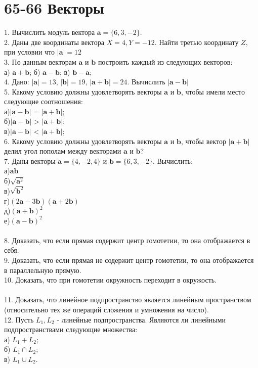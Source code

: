 \documentclass[12pt]{article}
\begin{document}
\section*{65-66 Векторы}
1. Вычислить модуль вектора $\bm{a} = \{6, 3, -2\}.$\\
2. Даны две координаты вектора $X = 4, Y = -12$. Найти третью координату $Z$, при условии что $|\bm{a}| = 12$\\
3. По данным векторам $\bm{a}$ и $\bm{b}$ построить каждый из следующих векторов:\\
а) $\bm{a+b}$;
б) $\bm{a-b}$;
в) $\bm{b-a}$;\\
4. Дано: $|\bm{a}| = 13$, $|\bm{b}| = 19$, $|\bm{a+b}| = 24$. Вычислить $|\bm{a-b}|$\\
5. Какому условию должны удовлетворять векторы $\bm{a}$ и $\bm{b}$, чтобы имели место следующие соотношения:\\
а)$|\bm{a-b}|$ = $|\bm{a+b}|$;\\
б)$|\bm{a-b}|$ > $|\bm{a+b}|$;\\
в)$|\bm{a-b}|$ < $|\bm{a+b}|$;\\
6. Какому условию должны удовлетворять векторы $\bm{a}$ и $\bm{b}$, чтобы вектор $|\bm{a+b}|$ делил угол пополам между векторами $\bm{a}$ и $\bm{b}$?\\
7. Даны векторы $\bm{a} = \{4,-2,4\}$ и $\bm{b} = \{6, 3, -2\}$. Вычислить:\\
а)$\bm{a}\bm{b} $\\
б)$\sqrt{\bm{a}^2}$\\
в)$\sqrt{\bm{b}^2}$\\
г)$(2\bm{a} - 3\bm{b})(\bm{a}+2\bm{b})$\\
д)$(\bm{a}+\bm{b})^2$\\
е)$(\bm{a}-\bm{b})^2$\\
\\
8. Доказать, что если прямая содержит центр гомотетии, то она отображается в себя.\\
9. Доказать, что если прямая не содержит центр гомотетии, то она отображается в параллельную прямую.\\
10.  Доказать, что при гомотетии окружность переходит в окружость.\\
\\
11. Доказать, что линейное подпространство является линейным пространством (относительно тех же операций сложения и умножения на число).\\
12. Пусть $L_1, L_2$ - линейные подпространства. Являются ли линейными подпространствами следующие множества:\\
а) $L_1 + L_2$;\\
б) $L_1 \cap L_2$;\\ 
в) $L_1 \cup L_2$.\\
\end{document}
